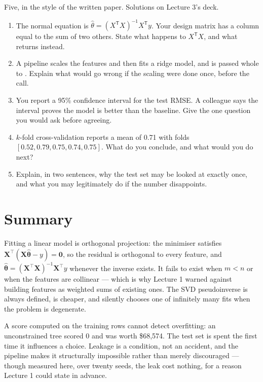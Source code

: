 \documentclass[11pt,a4paper]{article}
\begin{document}
Five, in the style of the written paper. Solutions on Lecture 3's deck.

\begin{enumerate}[leftmargin=1.6em,itemsep=4pt]
  \item The normal equation is
        $\hat\theta = (X^{\mathsf T}X)^{-1}X^{\mathsf T}y$. Your design matrix
        has a column equal to the sum of two others. State what happens to
        $X^{\mathsf T}X$, and what  returns instead.
        \hfill \scope{[5]}
  \item A pipeline scales the features and then fits a ridge model, and is
        passed whole to . Explain what would go wrong
        if the scaling were done once, before the call. \hfill \scope{[5]}
  \item You report a 95\% confidence interval for the test RMSE. A colleague
        says the interval proves the model is better than the baseline. Give
        the one question you would ask before agreeing. \hfill \scope{[4]}
  \item $k$-fold cross-validation reports a mean of 0.71 with folds
        $[0.52, 0.79, 0.75, 0.74, 0.75]$. What do you conclude, and what would
        you do next? \hfill \scope{[5]}
  \item Explain, in two sentences, why the test set may be looked at exactly
        once, and what you may legitimately do if the number disappoints.
        \hfill \scope{[4]}
\end{enumerate}

\section*{Summary}

Fitting a linear model is orthogonal projection: the minimiser satisfies
$\mathbf{X}^{\intercal}(\mathbf{X}\hat{\boldsymbol\theta}-y)=\mathbf{0}$, so
the residual is orthogonal to every feature, and
$\hat{\boldsymbol\theta} = (\mathbf{X}^{\intercal}\mathbf{X})^{-1}
\mathbf{X}^{\intercal}y$ whenever the inverse exists. It fails to exist when
$m < n$ or when the features are collinear --- which is why Lecture 1 warned
against building features as weighted sums of existing ones. The SVD
pseudoinverse is always defined, is cheaper, and silently chooses one of
infinitely many fits when the problem is degenerate.

A score computed on the training rows cannot detect overfitting: an
unconstrained tree scored $0$ and was worth \$68{,}574. The test set is spent
the first time it influences a choice. Leakage is a condition, not an accident,
and the pipeline makes it structurally impossible rather than merely
discouraged --- though measured here, over twenty seeds, the leak cost nothing,
for a reason Lecture 1 could state in advance.
\end{document}
